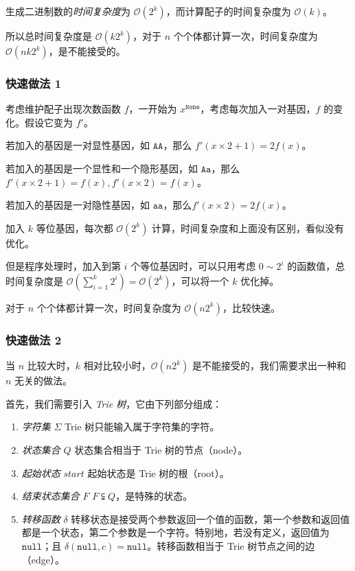 \documentclass{article}
\begin{document}
生成二进制数的\textsl{时间复杂度}为 $\mathcal O(2^k)$，而计算配子的时间复杂度为 $\mathcal O(k)$。

所以总时间复杂度是 $\mathcal O(k 2^k)$，对于 $n$ 个个体都计算一次，时间复杂度为 $\mathcal O(nk 2^k)$，是不能接受的。

\subsubsection*{快速做法 1}

考虑维护配子出现次数函数 $f$，一开始为 $x^{\texttt{None}}$，考虑每次加入一对基因，$f$ 的变化。假设它变为 $f'$。

若加入的基因是一对显性基因，如 $\texttt{AA}$，那么 $f'(x \times 2 + 1)=2f(x)$。

若加入的基因是一个显性和一个隐形基因，如 $\texttt{Aa}$，那么 $f'(x \times 2 + 1)=f(x),f'(x \times 2)=f(x)$。

若加入的基因是一对隐性基因，如 $\texttt{aa}$，那么$f'(x \times 2)=2f(x)$。

加入 $k$ 等位基因，每次都 $\mathcal O(2^k)$ 计算，时间复杂度和上面没有区别，看似没有优化。

但是程序处理时，加入到第 $i$ 个等位基因时，可以只用考虑 $0 \sim 2^i$ 的函数值，总时间复杂度是 $\mathcal O(\sum_{i=1}^k 2^i)=\mathcal O(2^k)$，可以将一个 $k$ 优化掉。

对于 $n$ 个个体都计算一次，时间复杂度为 $\mathcal O(n2^k)$，比较快速。

\newpage

\subsubsection*{快速做法 2}

当 $n$ 比较大时，$k$ 相对比较小时，$\mathcal O(n2^k)$ 是不能接受的，我们需要求出一种和 $n$ 无关的做法。

首先，我们需要引入 \textsl{Trie 树}，它由下列部分组成：

\begin{enumerate}
    \item \textsl{字符集} $\Sigma$ \qquad Trie 树只能输入属于字符集的字符。
    \item \textsl{状态集合} $Q$ \qquad 状态集合相当于 Trie 树的节点（node）。
    \item \textsl{起始状态} $start$ \qquad 起始状态是 Trie 树的根（root）。
    \item \textsl{结束状态集合} $F$ \qquad $F \subsetneqq Q$，是特殊的状态。
    \item \textsl{转移函数} $\delta$ \qquad 转移状态是接受两个参数返回一个值的函数，第一个参数和返回值都是一个状态，第二个参数是一个字符。特别地，若没有定义，返回值为 $\texttt{null}$；且 $\delta(\texttt{null},c)=\texttt{null}$。转移函数相当于 Trie 树节点之间的边（edge）。
\end{enumerate}
\end{document}
